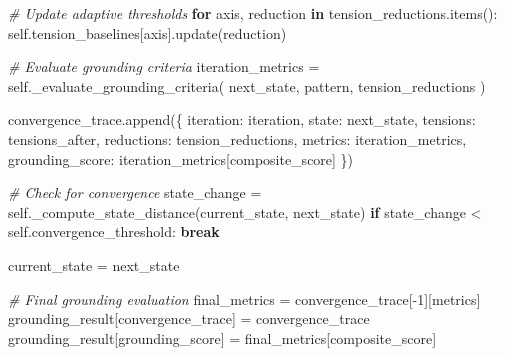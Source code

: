 \documentclass[
]{article}
\newenvironment{Shaded}{}{}
\newcommand{\CommentTok}[1]{\textcolor[rgb]{0.38,0.63,0.69}{\textit{#1}}}
\newcommand{\ControlFlowTok}[1]{\textcolor[rgb]{0.00,0.44,0.13}{\textbf{#1}}}
\newcommand{\DecValTok}[1]{\textcolor[rgb]{0.25,0.63,0.44}{#1}}
\newcommand{\KeywordTok}[1]{\textcolor[rgb]{0.00,0.44,0.13}{\textbf{#1}}}
\newcommand{\NormalTok}[1]{#1}
\newcommand{\OperatorTok}[1]{\textcolor[rgb]{0.40,0.40,0.40}{#1}}
\newcommand{\StringTok}[1]{\textcolor[rgb]{0.25,0.44,0.63}{#1}}
\newcommand{\VariableTok}[1]{\textcolor[rgb]{0.10,0.09,0.49}{#1}}
\begin{document}
\begin{Shaded}
\begin{Highlighting}[]
            \CommentTok{\# Update adaptive thresholds}
            \ControlFlowTok{for}\NormalTok{ axis, reduction }\KeywordTok{in}\NormalTok{ tension\_reductions.items():}
                \VariableTok{self}\NormalTok{.tension\_baselines[axis].update(reduction)}

            \CommentTok{\# Evaluate grounding criteria}
\NormalTok{            iteration\_metrics }\OperatorTok{=} \VariableTok{self}\NormalTok{.\_evaluate\_grounding\_criteria(}
\NormalTok{                next\_state, pattern, tension\_reductions}
\NormalTok{            )}

\NormalTok{            convergence\_trace.append(\{}
                \StringTok{\textquotesingle{}iteration\textquotesingle{}}\NormalTok{: iteration,}
                \StringTok{\textquotesingle{}state\textquotesingle{}}\NormalTok{: next\_state,}
                \StringTok{\textquotesingle{}tensions\textquotesingle{}}\NormalTok{: tensions\_after,}
                \StringTok{\textquotesingle{}reductions\textquotesingle{}}\NormalTok{: tension\_reductions,}
                \StringTok{\textquotesingle{}metrics\textquotesingle{}}\NormalTok{: iteration\_metrics,}
                \StringTok{\textquotesingle{}grounding\_score\textquotesingle{}}\NormalTok{: iteration\_metrics[}\StringTok{\textquotesingle{}composite\_score\textquotesingle{}}\NormalTok{]}
\NormalTok{            \})}

            \CommentTok{\# Check for convergence}
\NormalTok{            state\_change }\OperatorTok{=} \VariableTok{self}\NormalTok{.\_compute\_state\_distance(current\_state, next\_state)}
            \ControlFlowTok{if}\NormalTok{ state\_change }\OperatorTok{\textless{}} \VariableTok{self}\NormalTok{.convergence\_threshold:}
                \ControlFlowTok{break}

\NormalTok{            current\_state }\OperatorTok{=}\NormalTok{ next\_state}

        \CommentTok{\# Final grounding evaluation}
\NormalTok{        final\_metrics }\OperatorTok{=}\NormalTok{ convergence\_trace[}\OperatorTok{{-}}\DecValTok{1}\NormalTok{][}\StringTok{\textquotesingle{}metrics\textquotesingle{}}\NormalTok{]}
\NormalTok{        grounding\_result[}\StringTok{\textquotesingle{}convergence\_trace\textquotesingle{}}\NormalTok{] }\OperatorTok{=}\NormalTok{ convergence\_trace}
\NormalTok{        grounding\_result[}\StringTok{\textquotesingle{}grounding\_score\textquotesingle{}}\NormalTok{] }\OperatorTok{=}\NormalTok{ final\_metrics[}\StringTok{\textquotesingle{}composite\_score\textquotesingle{}}\NormalTok{]}


\end{Highlighting}
\end{Shaded}
\end{document}
